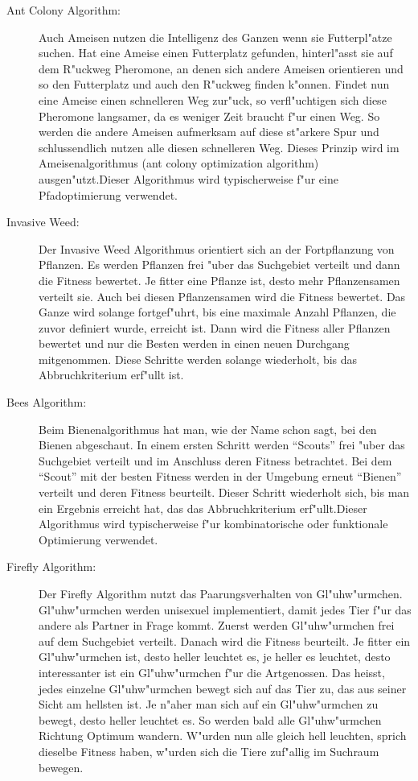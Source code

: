 \begin{description}
\item[Ant Colony Algorithm:]
Auch Ameisen nutzen die Intelligenz des Ganzen wenn sie Futterpl"atze
suchen. Hat eine Ameise einen Futterplatz gefunden, hinterl"asst sie
auf dem R"uckweg Pheromone, an denen sich andere Ameisen orientieren
und so den Futterplatz und auch den R"uckweg finden k"onnen. Findet
nun eine Ameise einen schnelleren Weg zur"uck, so verfl"uchtigen
sich diese Pheromone langsamer, da es weniger Zeit braucht f"ur einen
Weg. So werden die andere Ameisen aufmerksam auf diese st"arkere Spur und
schlussendlich nutzen alle diesen schnelleren Weg. Dieses Prinzip wird im
Ameisenalgorithmus (ant colony optimization algorithm) ausgen"utzt.Dieser
Algorithmus wird typischerweise f"ur eine Pfadoptimierung verwendet.

\item [Invasive Weed:]
Der Invasive Weed Algorithmus orientiert sich an der Fortpflanzung
von Pflanzen. Es werden Pflanzen frei "uber das Suchgebiet verteilt
und dann die Fitness bewertet. Je fitter eine Pflanze ist, desto mehr
Pflanzensamen verteilt sie. Auch bei diesen Pflanzensamen wird die
Fitness bewertet. Das Ganze wird solange fortgef"uhrt, bis eine maximale
Anzahl Pflanzen, die zuvor definiert wurde, erreicht ist. Dann wird
die Fitness aller Pflanzen bewertet und nur die Besten werden in einen
neuen Durchgang mitgenommen. Diese Schritte werden solange wiederholt,
bis das Abbruchkriterium erf"ullt ist.
		

\item [Bees Algorithm:]
Beim Bienenalgorithmus hat man, wie der Name schon sagt, bei den Bienen
abgeschaut.
In einem ersten Schritt werden ``Scouts''
frei "uber das Suchgebiet verteilt und im Anschluss deren Fitness
betrachtet. Bei dem ``Scout'' mit der besten
Fitness werden in der Umgebung erneut ``Bienen''
verteilt und deren Fitness beurteilt. Dieser Schritt wiederholt sich, bis
man ein Ergebnis erreicht hat, das das Abbruchkriterium erf"ullt.Dieser
Algorithmus wird typischerweise f"ur kombinatorische oder funktionale
Optimierung verwendet.

\item[Firefly Algorithm:]
Der Firefly Algorithm nutzt das Paarungsverhalten von
Gl"uhw"urmchen. Gl"uhw"urmchen werden unisexuel implementiert, damit
jedes Tier f"ur das andere als Partner in Frage kommt.
Zuerst werden Gl"uhw"urmchen frei auf dem Suchgebiet verteilt. Danach
wird die Fitness beurteilt. Je fitter ein Gl"uhw"urmchen ist, desto
heller leuchtet es, je heller es leuchtet, desto interessanter ist
ein Gl"uhw"urmchen f"ur die Artgenossen. Das heisst, jedes einzelne
Gl"uhw"urmchen bewegt sich auf das Tier zu, das aus seiner Sicht am
hellsten ist. Je n"aher man sich auf ein Gl"uhw"urmchen zu bewegt, desto
heller leuchtet es. So werden bald alle Gl"uhw"urmchen Richtung Optimum
wandern. W"urden nun alle gleich hell leuchten, sprich dieselbe Fitness
haben, w"urden sich die Tiere zuf"allig im Suchraum bewegen.

\end{description}
